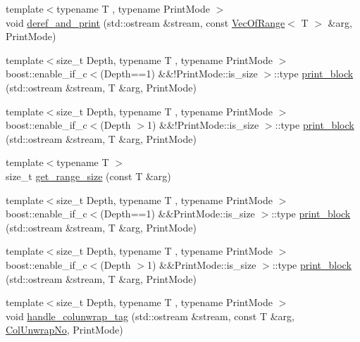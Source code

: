 \begin{DoxyCompactItemize}
\item 
{\footnotesize template$<$typename T , typename Print\+Mode $>$ }\\void \hyperlink{namespacegnuplotio_ae768911c8adb77bfc080d5e4561573e6}{deref\+\_\+and\+\_\+print} (std\+::ostream \&stream, const \hyperlink{classgnuplotio_1_1_vec_of_range}{Vec\+Of\+Range}$<$ T $>$ \&arg, Print\+Mode)
\item 
{\footnotesize template$<$size\+\_\+t Depth, typename T , typename Print\+Mode $>$ }\\boost\+::enable\+\_\+if\+\_\+c$<$(Depth==1) \&\&!Print\+Mode\+::is\+\_\+size $>$\+::type \hyperlink{namespacegnuplotio_a631368ab4e255d2a5d563a41895f2edc}{print\+\_\+block} (std\+::ostream \&stream, T \&arg, Print\+Mode)
\item 
{\footnotesize template$<$size\+\_\+t Depth, typename T , typename Print\+Mode $>$ }\\boost\+::enable\+\_\+if\+\_\+c$<$(Depth $>$1) \&\&!Print\+Mode\+::is\+\_\+size $>$\+::type \hyperlink{namespacegnuplotio_a753a3551f418723c022be60c12379025}{print\+\_\+block} (std\+::ostream \&stream, T \&arg, Print\+Mode)
\item 
{\footnotesize template$<$typename T $>$ }\\size\+\_\+t \hyperlink{namespacegnuplotio_abb416b68686102ba84a2cb53c96b64e9}{get\+\_\+range\+\_\+size} (const T \&arg)
\item 
{\footnotesize template$<$size\+\_\+t Depth, typename T , typename Print\+Mode $>$ }\\boost\+::enable\+\_\+if\+\_\+c$<$(Depth==1) \&\&Print\+Mode\+::is\+\_\+size $>$\+::type \hyperlink{namespacegnuplotio_ae470a0908ac5f51527ff76ecbc1616d1}{print\+\_\+block} (std\+::ostream \&stream, T \&arg, Print\+Mode)
\item 
{\footnotesize template$<$size\+\_\+t Depth, typename T , typename Print\+Mode $>$ }\\boost\+::enable\+\_\+if\+\_\+c$<$(Depth $>$1) \&\&Print\+Mode\+::is\+\_\+size $>$\+::type \hyperlink{namespacegnuplotio_a94e97ca55dc1e5142dcc4457a5e1dd2d}{print\+\_\+block} (std\+::ostream \&stream, T \&arg, Print\+Mode)
\item 
{\footnotesize template$<$size\+\_\+t Depth, typename T , typename Print\+Mode $>$ }\\void \hyperlink{namespacegnuplotio_aef147f3d42f3f2c89cc4c895b8494150}{handle\+\_\+colunwrap\+\_\+tag} (std\+::ostream \&stream, const T \&arg, \hyperlink{structgnuplotio_1_1_col_unwrap_no}{Col\+Unwrap\+No}, Print\+Mode)
\item 

\end{DoxyCompactItemize}
